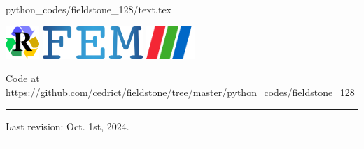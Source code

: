 \begin{flushright} {\tiny {\color{gray} python\_codes/fieldstone\_128/text.tex}} \end{flushright}

\noindent
\includegraphics[height=1.25cm]{images/pictograms/replication}
\includegraphics[height=1.25cm]{images/pictograms/FEM}
\includegraphics[height=1.25cm]{images/pictograms/paraview}


%

\begin{center}
\inpython
Code at \url{https://github.com/cedrict/fieldstone/tree/master/python_codes/fieldstone_128}
\end{center}

\par\noindent\rule{\textwidth}{0.4pt}


Last revision: Oct. 1st, 2024.

\par\noindent\rule{\textwidth}{0.4pt}


